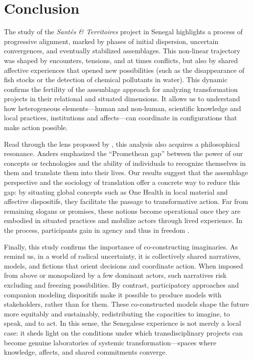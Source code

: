 \documentclass{article}
\begin{document}
\section{Conclusion}

The study of the \textit{Santés \& Territoires} project in Senegal highlights a process of progressive alignment, marked by phases of initial dispersion, uncertain convergences, and eventually stabilized assemblages. This non-linear trajectory was shaped by encounters, tensions, and at times conflicts, but also by shared affective experiences that opened new possibilities (such as the disappearance of fish stocks or the detection of chemical pollutants in water). This dynamic confirms the fertility of the assemblage approach for analyzing transformation projects in their relational and situated dimensions. It allows us to understand how heterogeneous elements—human and non-human, scientific knowledge and local practices, institutions and affects—can coordinate in configurations that make action possible.  

Read through the lens proposed by \textcite{anders_obsolescence_1956}, this analysis also acquires a philosophical resonance. Anders emphasized the “Promethean gap” between the power of our concepts or technologies and the ability of individuals to recognize themselves in them and translate them into their lives. Our results suggest that the assemblage perspective and the sociology of translation offer a concrete way to reduce this gap: by situating global concepts such as One Health in local material and affective dispositifs, they facilitate the passage to transformative action. Far from remaining slogans or promises, these notions become operational once they are embodied in situated practices and mobilize actors through lived experience. In the process, participants gain in agency and thus in freedom \parencite{sen_development_1999}.  

Finally, this study confirms the importance of co-constructing imaginaries. As \textcite{castoriadis_domaines_1999, beckert_uncertain_2018} remind us, in a world of radical uncertainty, it is collectively shared narratives, models, and fictions that orient decisions and coordinate action. When imposed from above or monopolized by a few dominant actors, such narratives risk excluding and freezing possibilities. By contrast, participatory approaches and companion modeling dispositifs make it possible to produce models with stakeholders, rather than for them. These co-constructed models shape the future more equitably and sustainably, redistributing the capacities to imagine, to speak, and to act. In this sense, the Senegalese experience is not merely a local case: it sheds light on the conditions under which transdisciplinary projects can become genuine laboratories of systemic transformation—spaces where knowledge, affects, and shared commitments converge.  


\printbibliography
\end{document}
